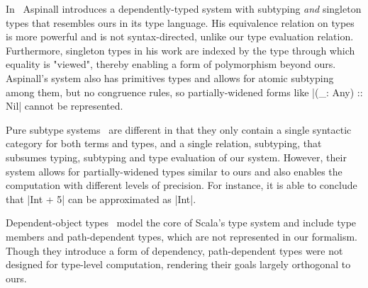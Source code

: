 In~\citep{aspinall1994subtyping} Aspinall introduces a dependently-typed system with subtyping \emph{and} singleton types that resembles ours in its type language.
His equivalence relation on types is more powerful and is not syntax-directed, unlike our type evaluation relation.
Furthermore, singleton types in his work are indexed by the type through which equality is "viewed", thereby enabling a form of polymorphism beyond ours.
Aspinall's system also has primitives types and allows for atomic subtyping among them, but no congruence rules, so partially-widened forms like |(_: Any) :: Nil| cannot be represented.

Pure subtype systems~\citep{hutchins2010pure} are different in that they only contain a single syntactic category for both terms and types, and a single relation, subtyping, that subsumes typing, subtyping and type evaluation of our system.
However, their system allows for partially-widened types similar to ours and also enables the computation with different levels of precision.
For instance, it is able to conclude that |Int + 5| can be approximated as |Int|.

Dependent-object types~\citep{amin2017type} model the core of Scala's type system and include type members and path-dependent types, which are not represented in our formalism.
Though they introduce a form of dependency, path-dependent types were not designed for type-level computation, rendering their goals largely orthogonal to ours.
